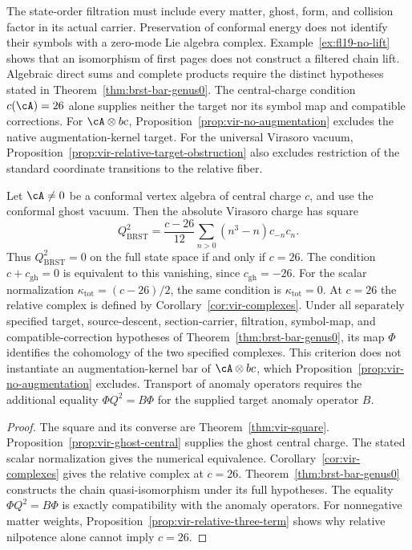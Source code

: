 \begin{remark}
\label{rem:brst-bar-scope}
The state-order filtration must include every matter, ghost, form, and collision factor in its actual carrier.
Preservation of conformal energy does not identify their symbols with a zero-mode Lie algebra complex.
Example~\ref{ex:fl19-no-lift} shows that an isomorphism of first pages does not construct a filtered chain lift.
Algebraic direct sums and complete products require the distinct hypotheses stated in Theorem~\ref{thm:brst-bar-genus0}.
The central-charge condition $c(\cA)=26$ alone supplies neither the target nor its symbol map and compatible corrections.
For $\cA\otimes bc$, Proposition~\ref{prop:vir-no-augmentation} excludes the native augmentation-kernel target.
For the universal Virasoro vacuum, Proposition~\ref{prop:vir-relative-target-obstruction} also excludes restriction of the standard coordinate transitions to the relative fiber.
\end{remark}

\begin{corollary}
\label{cor:anomaly-physical-genus0}
Let $\cA\neq0$ be a conformal vertex algebra of central charge $c$, and use the conformal ghost vacuum.
Then the absolute Virasoro charge has square
\[
 Q_{\mathrm{BRST}}^2=\frac{c-26}{12}\sum_{n>0}(n^3-n)c_{-n}c_n.
\]
Thus $Q_{\mathrm{BRST}}^2=0$ on the full state space if and only if $c=26$.
The condition $c+c_{\mathrm{gh}}=0$ is equivalent to this vanishing, since $c_{\mathrm{gh}}=-26$.
For the scalar normalization $\kappa_{\mathrm{tot}}=(c-26)/2$, the same condition is $\kappa_{\mathrm{tot}}=0$.
At $c=26$ the relative complex is defined by Corollary~\ref{cor:vir-complexes}.
Under all separately specified target, source-descent, section-carrier, filtration, symbol-map, and compatible-correction hypotheses of Theorem~\ref{thm:brst-bar-genus0}, its map $\Phi$ identifies the cohomology of the two specified complexes.
This criterion does not instantiate an augmentation-kernel bar of $\cA\otimes bc$, which Proposition~\ref{prop:vir-no-augmentation} excludes.
Transport of anomaly operators requires the additional equality
$\Phi Q^2=B\Phi$ for the supplied target anomaly operator $B$.
\end{corollary}

\begin{proof}
The square and its converse are Theorem~\ref{thm:vir-square}.
Proposition~\ref{prop:vir-ghost-central} supplies the ghost central charge.
The stated scalar normalization gives the numerical equivalence.
Corollary~\ref{cor:vir-complexes} gives the relative complex at $c=26$.
Theorem~\ref{thm:brst-bar-genus0} constructs the chain quasi-isomorphism under its full hypotheses.
The equality $\Phi Q^2=B\Phi$ is exactly compatibility with the anomaly operators.
For nonnegative matter weights, Proposition~\ref{prop:vir-relative-three-term} shows why relative nilpotence alone cannot imply $c=26$.
\end{proof}

